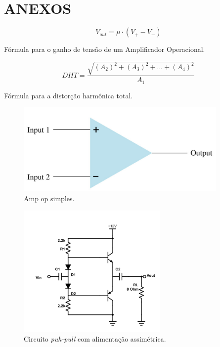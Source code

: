 \section*{ANEXOS}
    \begin{eqfloat}[h!]
        \begin{equation}
            V_{out} = \mu \cdot (V_{+} - V_{-})
            \label{eq:ganhoAmpOp}
        \end{equation}
        \caption{Fórmula para o ganho de tensão de um Amplificador Operacional.}
    \end{eqfloat}
    
    \begin{eqfloat}[h!]
        \begin{equation}
            DHT = \frac{\sqrt{(A_2)^2 + (A_3)^2 + ... + (A_4)^2}}{A_1}
            \label{eq:dht}
        \end{equation}
        \caption{Fórmula para a distorção harmônica total.}
    \end{eqfloat}
    
    
    \begin{figure}[h!]
        \centering
        \includegraphics[height=4.5cm]{imgSource/basicAmpOp.png}
        \caption{Amp op simples.}
        \label{fig:ampOp}
    \end{figure}

    \begin{figure}[h!]
        \centering
        \includegraphics[height=6.5cm]{imgSource/circuits/pushPull.png}
        \caption{Circuito \emph{puh-pull} com alimentação assimétrica.}
        \label{fig:circ1}
    \end{figure}

